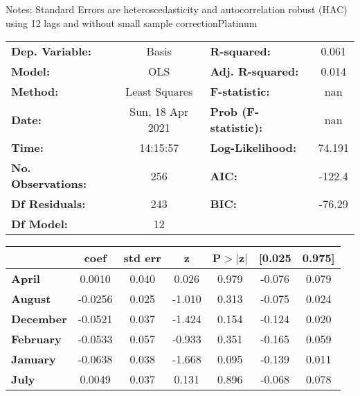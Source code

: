 Notes: \newline
 [1] Standard Errors are heteroscedasticity and autocorrelation robust (HAC) using 12 lags and without small sample correctionPlatinum\begin{center}
\begin{tabular}{lclc}
\toprule
\textbf{Dep. Variable:}    &      Basis       & \textbf{  R-squared:         } &     0.061   \\
\textbf{Model:}            &       OLS        & \textbf{  Adj. R-squared:    } &     0.014   \\
\textbf{Method:}           &  Least Squares   & \textbf{  F-statistic:       } &       nan   \\
\textbf{Date:}             & Sun, 18 Apr 2021 & \textbf{  Prob (F-statistic):} &      nan    \\
\textbf{Time:}             &     14:15:57     & \textbf{  Log-Likelihood:    } &    74.191   \\
\textbf{No. Observations:} &         256      & \textbf{  AIC:               } &    -122.4   \\
\textbf{Df Residuals:}     &         243      & \textbf{  BIC:               } &    -76.29   \\
\textbf{Df Model:}         &          12      & \textbf{                     } &             \\
\bottomrule
\end{tabular}
\begin{tabular}{lcccccc}
                   & \textbf{coef} & \textbf{std err} & \textbf{z} & \textbf{P$> |$z$|$} & \textbf{[0.025} & \textbf{0.975]}  \\
\midrule
\textbf{April}     &       0.0010  &        0.040     &     0.026  &         0.979        &       -0.076    &        0.079     \\
\textbf{August}    &      -0.0256  &        0.025     &    -1.010  &         0.313        &       -0.075    &        0.024     \\
\textbf{December}  &      -0.0521  &        0.037     &    -1.424  &         0.154        &       -0.124    &        0.020     \\
\textbf{February}  &      -0.0533  &        0.057     &    -0.933  &         0.351        &       -0.165    &        0.059     \\
\textbf{January}   &      -0.0638  &        0.038     &    -1.668  &         0.095        &       -0.139    &        0.011     \\
\textbf{July}      &       0.0049  &        0.037     &     0.131  &         0.896        &       -0.068    &        0.078     \\

\end{tabular}
\end{center}
